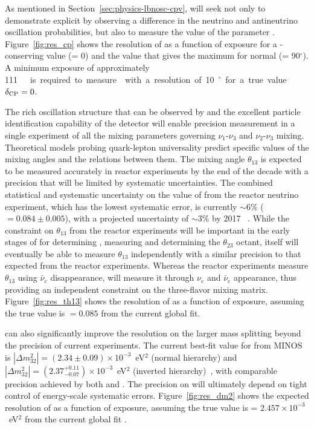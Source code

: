 As mentioned in Section~\ref{sec:physics-lbnosc-cpv},  will seek not only to demonstrate explicit  by observing a difference in the neutrino and antineutrino oscillation probabilities, but also to measure the value of the parameter \deltacp. Figure~\ref{fig:res_cp} shows the resolution of \deltacp as a function of exposure for a -conserving value (\deltacp = 0) and the value
that gives the maximum  for normal  (\deltacp =
90\mbox{$^{\circ}$}).  A minimum exposure of approximately
\SI{111}~\ktMWyr{}  is required to measure \deltacp with a resolution of 10\mbox{$^{\circ}$} for
a true value $\delta_{\rm CP} = 0$.

The rich oscillation structure that can be observed by  and the excellent particle identification capability of the detector will enable precision measurement  in a single experiment of all the mixing parameters governing $\nu_1$-$\nu_3$ and $\nu_2$-$\nu_3$ mixing. Theoretical models probing quark-lepton universality predict specific values of the mixing angles and the relations between them. The mixing angle $\theta_{13}$ is
expected to be measured accurately in reactor experiments by the end of the decade with a precision that will be limited by systematic uncertainties. 
The combined statistical and systematic uncertainty on the value of   from the  reactor neutrino experiment, which has the lowest systematic error, is currently $\sim6$\% ( $= 0.084\pm0.005$),
with a projected uncertainty of $\sim$3\% by 2017~\cite{Zhang:2015fya} .
While the constraint on $\theta_{13}$ from the reactor experiments will be important in the
early stages of  for determining , measuring
\deltacp and determining the $\theta_{23}$ octant, 
 itself will eventually be able to measure
$\theta_{13}$ independently with a similar precision to that expected from the reactor experiments. 
Whereas the reactor experiments measure $\theta_{13}$ using $\bar{\nu}_e$ disappearance,  will measure it through $\nu_e$ and $\bar{\nu}_e$ appearance, thus providing an independent constraint on
the three-flavor mixing matrix.   Figure~\ref{fig:res_th13} shows the resolution of  as a function of exposure, assuming the true value is $ = 0.085$ from the current global fit.

 can also significantly improve the
resolution on the larger mass splitting beyond the precision of current experiments.  The current best-fit value for 
 from MINOS is $|\Delta m^2_{32}| = (2.34\pm0.09)\times10^{-3}$~eV$^2$ (normal hierarchy) and $|\Delta m^2_{32}| = (2.37^{+0.11}_{-0.07})\times10^{-3}$~eV$^2$ (inverted hierarchy)~\cite{Sousa:2015bxa}, with comparable precision achieved by both  and  . The precision on  will ultimately depend on tight control of energy-scale systematic errors.  Figure~\ref{fig:res_dm2} shows the expected resolution of  as a function of exposure, assuming the true value is  = $2.457\times10^{-3}$~eV$^2$ from the current global fit .


